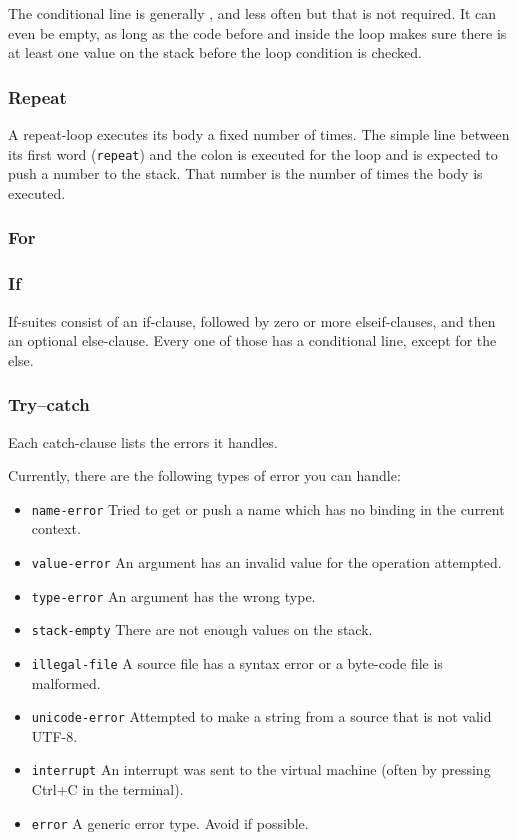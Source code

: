The conditional line is generally , and less often 
but that is not required. It can even be empty, as long as the code before and inside the loop makes sure there is at least one value on the stack before the loop
condition is checked.

\subsubsection{Repeat}

A repeat-loop executes its body a fixed number of times. The simple line
between its first word (\verb!repeat!) and the colon is executed for the loop
and is expected to push a number to the stack. That number is the number
of times the body is executed.

\subsubsection{For}
\subsubsection{If}

If-suites consist of an if-clause, followed by zero or more elseif-clauses, and then an optional else-clause. Every one of those has a conditional line, except for the else.

\subsubsection{Try--catch}

Each catch-clause lists the errors it handles.

Currently, there are the following types of error you can handle:

\begin{itemize}
	\item \verb!name-error! Tried to get or push a name which has no binding in the current context.
	\item \verb!value-error! An argument has an invalid value for the operation attempted.
	\item \verb!type-error! An argument has the wrong type.
	\item \verb!stack-empty! There are not enough values on the stack.
	\item \verb!illegal-file! A source file has a syntax error or a byte-code file is malformed.
	\item \verb!unicode-error! Attempted to make a string from a source that is not valid UTF-8.
	\item \verb!interrupt! An interrupt was sent to the virtual machine (often by pressing Ctrl+C in the terminal).
	\item \verb!error! A generic error type. Avoid if possible.
\end{itemize}

